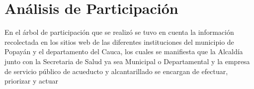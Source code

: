 \section{Análisis de Participación}
  
  En el árbol de participación que se realizó se tuvo en cuenta la información recolectada en los sitios web de las diferentes instituciones del municipio de Popayán y el departamento del Cauca, los cuales se manifiesta que la Alcaldía junto con la Secretaria de Salud ya sea Municipal o Departamental y la empresa de servicio público de acueducto y alcantarillado se encargan de efectuar, priorizar y actuar  

